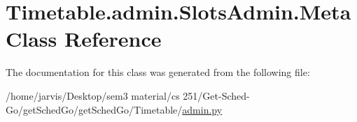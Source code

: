 \hypertarget{classTimetable_1_1admin_1_1SlotsAdmin_1_1Meta}{}\section{Timetable.\+admin.\+Slots\+Admin.\+Meta Class Reference}
\label{classTimetable_1_1admin_1_1SlotsAdmin_1_1Meta}


The documentation for this class was generated from the following file\+:\begin{DoxyCompactItemize}
\item 
/home/jarvis/\+Desktop/sem3 material/cs 251/\+Get-\/\+Sched-\/\+Go/get\+Sched\+Go/get\+Sched\+Go/\+Timetable/\hyperlink{Timetable_2admin_8py}{admin.\+py}\end{DoxyCompactItemize}

